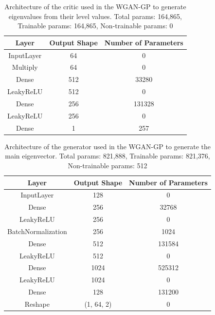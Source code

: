 \documentclass[11pt,a4paper,twoside]{report}
\begin{document}
\begin{table}[]
  \centering
  \begin{tabular}{c c c}
      \hline
      \textbf{Layer} & \textbf{Output Shape} & \textbf{Number of Parameters} \\ \hline
      InputLayer            & 64            & 0                 \\
      Multiply              & 64            & 0                 \\
      Dense                 & 512           & 33280             \\
      LeakyReLU             & 512           & 0                 \\
      Dense                 & 256           & 131328            \\
      LeakyReLU             & 256           & 0                 \\
      Dense                 & 1             & 257               \\
  \end{tabular}
  \caption{Architecture of the critic used in the WGAN-GP to generate eigenvalues from their level values. Total params: 164,865, Trainable params: 164,865, Non-trainable params: 0}
  \label{tab:evals_dB_critic_WGANGP_architecture}
\end{table}

\begin{table}[]
  \centering
  \begin{tabular}{c c c}
      \hline
      \textbf{Layer} & \textbf{Output Shape} & \textbf{Number of Parameters} \\ \hline
      InputLayer            & 128           & 0                 \\
      Dense                 & 256           & 32768             \\
      LeakyReLU             & 256           & 0                 \\
      BatchNormalization    & 256           & 1024              \\
      Dense                 & 512           & 131584            \\
      LeakyReLU             & 512           & 0                 \\
      Dense                 & 1024          & 525312            \\
      LeakyReLU             & 1024          & 0                 \\
      Dense                 & 128           & 131200            \\
      Reshape               & (1, 64, 2)    & 0                 \\
  \end{tabular}
  \caption{Architecture of the generator used in the WGAN-GP to generate the main eigenvector. Total params: 821,888, Trainable params: 821,376, Non-trainable params: 512}
  \label{tab:main_evec_generator_WGANGP_architecture}
\end{table}
\end{document}
